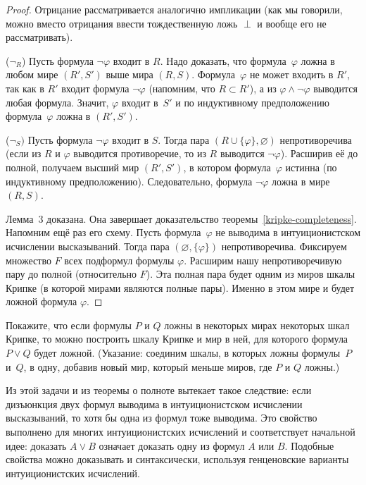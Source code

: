 \begin{proof}
Отрицание рассматривается аналогично импликации (как мы
говорили, можно вместо отрицания ввести тождественную
ложь $\perp$ и вообще его не рассматривать).

($\lnot_R$) Пусть формула $\lnot \varphi$ входит в $R$. Надо
доказать, что формула~$\varphi$ ложна в любом мире $(R',S')$
выше мира $(R,S)$. Формула~$\varphi$ не может входить в $R'$,
так как в $R'$ входит формула $\lnot\varphi$ (напомним, что
$R\subset R'$), а из ${\varphi\land\lnot\varphi}$ выводится
любая формула. Значит, $\varphi$ входит в~$S'$ и по индуктивному
предположению формула~$\varphi$ ложна в $(R',S')$.

($\lnot_S)$ Пусть формула $\lnot\varphi$ входит в $S$. Тогда
пара $({R\cup \{\varphi\}},\varnothing)$ не\-про\-ти\-во\-ре\-чи\-ва (если
из $R$ и $\varphi$ выводится противоречие, то из $R$ выводится
$\lnot\varphi$). Расширив её до полной, получаем высший мир
$(R',S')$, в котором формула~$\varphi$ истинна (по индуктивному
предположению). Следовательно, формула $\lnot\varphi$ ложна в
мире~$(R,S)$.

Лемма~3 доказана. Она завершает доказательство
теоремы~\ref{kripke-completeness}. Напомним ещё раз его схему.
Пусть формула~$\varphi$ не выводима в интуиционистском
исчислении высказываний. Тогда пара $(\varnothing,\{\varphi\})$
непротиворечива. Фиксируем множество $F$ всех подформул формулы
$\varphi$. Расширим нашу непротиворечивую пару до полной
(относительно $F$). Эта полная пара будет одним из миров шкалы
Крипке (в которой мирами являются полные пары). Именно в этом
мире и будет ложной формула $\varphi$.
\end{proof}

\begin{problem}
Покажите, что если формулы $P$ и $Q$ ложны в некоторых мирах
некоторых шкал Крипке, то можно построить шкалу Крипке и мир в ней,
для которого формула ${P\lor Q}$ будет ложной.
(Указание: соединим шкалы, в которых ложны формулы~$P$ и~$Q$, в
одну, добавив новый мир, который меньше миров, где $P$ и $Q$
ложны.)
\end{problem}

Из этой задачи и из теоремы о полноте вытекает такое следствие:
если дизъюнкция двух формул выводима в интуиционистском
исчислении высказываний, то хотя бы одна из формул тоже
выводима. Это свойство выполнено для многих интуиционистских
исчислений и соответствует начальной идее: доказать $A\lor B$
означает доказать одну из формул $A$ или $B$. Подобные свойства
можно доказывать и синтаксически, используя генценовские
варианты интуиционистских исчислений.

